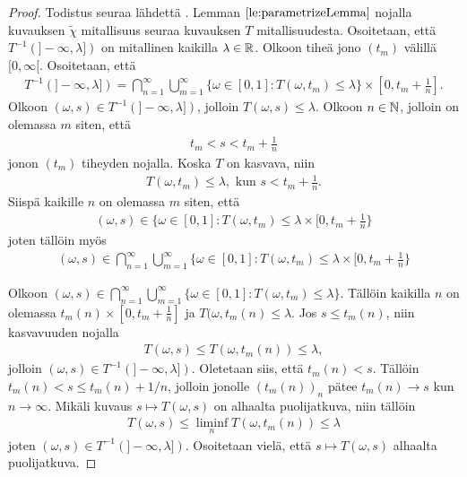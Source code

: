 \documentclass[12pt,oneside,a4paper]{amsbook} %
\begin{document}
\begin{proof}
    Todistus seuraa lähdettä \cite[s.40]{optimal}. Lemman $\ref{le:parametrizeLemma}$ nojalla kuvauksen $\tilde \chi$ mitallisuus seuraa kuvauksen $T$ mitallisuudesta. Osoitetaan, että $T^{-1}(]-\infty, \lambda])$ on mitallinen kaikilla $\lambda \in \mathbb{R}$. Olkoon tiheä jono $(t_m)$ välillä $[0, \infty[$. Osoitetaan, että
    \begin{align*}
        T^{-1}(]-\infty, \lambda]) = \bigcap_{n=1}^\infty \bigcup_{m=1}^\infty \{\omega \in [0, 1] : T(\omega, t_m) \le \lambda\} \times [0, t_m + \frac{1}{n}].
    \end{align*}
    Olkoon $(\omega, s) \in T^{-1}(]-\infty, \lambda])$, jolloin $T(\omega, s) \le \lambda$. Olkoon $n \in \mathbb{N}$, jolloin on olemassa $m$ siten, että 
    \begin{align*}
        t_m < s < t_m + \frac{1}{n}
    \end{align*}
    jonon $(t_m)$ tiheyden nojalla. Koska $T$ on kasvava, niin
    \begin{align*}
        T(\omega, t_m) \le \lambda, \text{ kun } s < t_m + \frac{1}{n}.
    \end{align*}
    Siispä kaikille $n$ on olemassa $m$ siten, että
    \begin{align*}
        (\omega, s) \in \{\omega \in [0, 1] : T(\omega, t_m) \le \lambda \times [0, t_m + \frac{1}{n}\}
    \end{align*}
    joten tällöin myös
    \begin{align*}
        (\omega, s) \in \bigcap_{n=1}^\infty \bigcup_{m=1}^\infty\{\omega \in [0, 1] : T(\omega, t_m) \le \lambda \times [0, t_m + \frac{1}{n}\}
    \end{align*}

    Olkoon $(\omega, s) \in \bigcap_{n=1}^\infty \bigcup_{m=1}^\infty \{\omega \in [0, 1] : T(\omega, t_m) \le \lambda\}.$ Tällöin kaikilla $n$ on olemassa $t_m(n) \times [0, t_m + \frac{1}{n}]$ ja $T(\omega, t_m(n) \le \lambda$. Jos $s \le t_m(n)$, niin kasvavuuden nojalla 
    \begin{align*}
        T(\omega, s) \le T(\omega, t_m(n)) \le \lambda,
    \end{align*}
    jolloin $(\omega, s) \in T^{-1}(]-\infty, \lambda])$. Oletetaan siis, että $t_m(n) < s$. Tällöin $t_m(n) < s \le t_m(n) + 1/n$, jolloin jonolle $(t_m(n))_n$ pätee $t_m(n) \to s$ kun $n \to \infty$. Mikäli kuvaus $s \mapsto T(\omega, s)$ on alhaalta puolijatkuva, niin tällöin
    \begin{align*}
        T(\omega, s) \le \liminf_n T(\omega, t_m(n)) \le \lambda
    \end{align*}
    joten $(\omega, s) \in T^{-1}(]-\infty, \lambda])$. Osoitetaan vielä, että $s \mapsto T(\omega, s)$ alhaalta puolijatkuva.
    

\end{proof}
\end{document}
